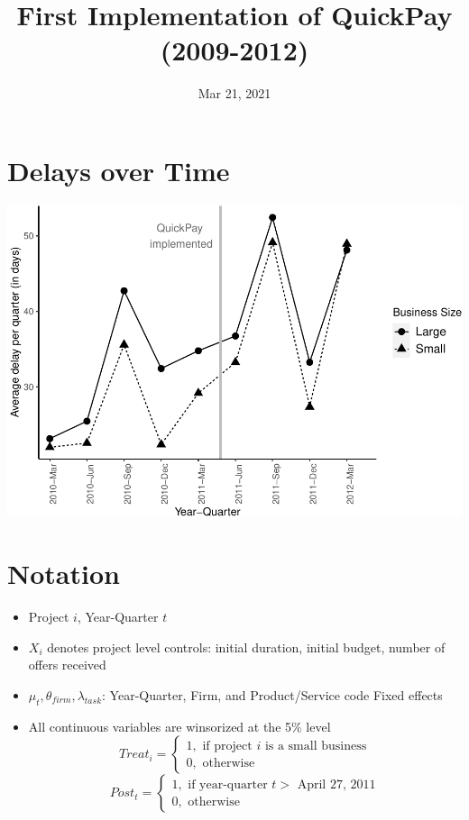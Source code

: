 \documentclass[
]{article}
\title{First Implementation of QuickPay (2009-2012)}
\author{}
\date{\vspace{-2.5em}Mar 21, 2021}
\providecommand{\tightlist}{%
  \setlength{\itemsep}{0pt}\setlength{\parskip}{0pt}}
\begin{document}
\maketitle

\hypertarget{delays-over-time}{%
\section{Delays over Time}\label{delays-over-time}}

\includegraphics{qp_first_implementation_files/figure-latex/plot-1.pdf}

\hypertarget{notation}{%
\section{Notation}\label{notation}}

\begin{itemize}
\tightlist
\item
  Project \(i\), Year-Quarter \(t\)
\item
  \(X_i\) denotes project level controls: initial duration, initial
  budget, number of offers received
\item
  \(\mu_t,\theta_{firm},\lambda_{task}\): Year-Quarter, Firm, and
  Product/Service code Fixed effects
\item
  All continuous variables are winsorized at the 5\% level
  \[ Treat_i = \begin{cases} 1, \text{ if project } i \text{ is a small business}\\
  0, \text{ otherwise} \end{cases}\]
  \[ Post_t = \begin{cases} 1, \text{ if year-quarter } t > \text{ April 27, 2011}\\
  0, \text{ otherwise} \end{cases}\]
\end{itemize}
\end{document}
